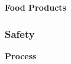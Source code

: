 \documentclass{report}
\begin{document}
\textbf{Food Products}



\subsubsection{Safety}


\textbf{Process}

\end{document}
